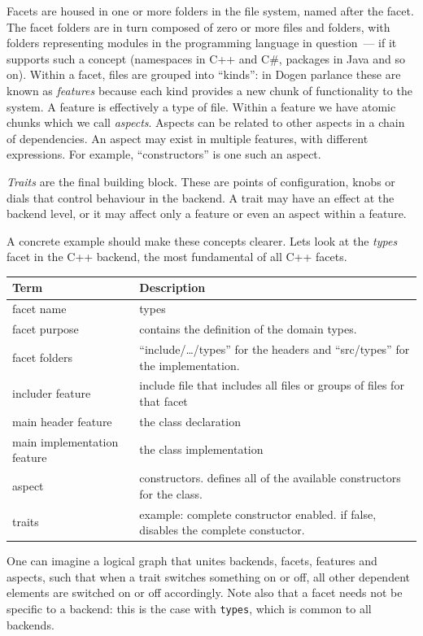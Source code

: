 \documentclass{book}
\begin{document}
Facets are housed in one or more folders in the file system, named
after the facet. The facet folders are in turn composed of zero or
more files and folders, with folders representing modules in the
programming language in question~--- if it supports such a concept
(namespaces in C++ and C\#, packages in Java and so on). Within a
facet, files are grouped into ``kinds'': in Dogen parlance these are
known as \emph{features} because each kind provides a new chunk of
functionality to the system. A feature is effectively a type of
file. Within a feature we have atomic chunks which we call
\emph{aspects}. Aspects can be related to other aspects in a chain of
dependencies. An aspect may exist in multiple features, with different
expressions. For example, ``constructors'' is one such an aspect.

\emph{Traits} are the final building block. These are points of
configuration, knobs or dials that control behaviour in the backend. A
trait may have an effect at the backend level, or it may affect only a
feature or even an aspect within a feature.

A concrete example should make these concepts clearer. Lets look at
the \emph{types} facet in the C++ backend, the most fundamental of all
C++ facets.

\begin{center}
\begin{tabular}{ll}
Term & Description\\
\hline
facet name & types\\
facet purpose & contains the definition of the domain types.\\
facet folders & ``include/\ldots{}/types'' for the headers and ``src/types'' for the implementation.\\
includer feature & include file that includes all files or groups of files for that facet\\
main header feature & the class declaration\\
main implementation feature & the class implementation\\
aspect & constructors. defines all of the available constructors for the class.\\
traits & example: complete constructor enabled. if false, disables the complete constuctor.\\
\end{tabular}
\end{center}

One can imagine a logical graph that unites backends, facets, features
and aspects, such that when a trait switches something on or off, all
other dependent elements are switched on or off accordingly. Note also
that a facet needs not be specific to a backend: this is the case with
\texttt{types}, which is common to all backends.
\end{document}
